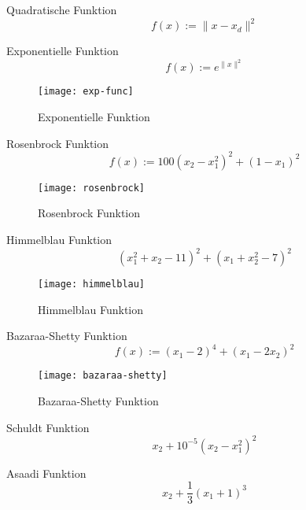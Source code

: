 
\begin{testfunction}
Quadratische Funktion
\[
  f(x) := \| x - x_d \|^2
\]
\end{testfunction}

\begin{testfunction}
Exponentielle Funktion
\[
  f(x) := e^{\|x\|^2}
\]
\end{testfunction}

\begin{figure}[h]
  \centering
  \texttt{[image: exp-func]}
  \caption{Exponentielle Funktion}
  \label{fig:exp_func}
\end{figure}

\begin{testfunction}
Rosenbrock Funktion
\[
  f(x) := 100(x_2-x_1^2)^2+(1-x_1)^2
\]
\end{testfunction}

\begin{figure}[h]
  \centering
  \texttt{[image: rosenbrock]}
  \caption{Rosenbrock Funktion}
  \label{fig:rosenbrock}
\end{figure}

\begin{testfunction}
Himmelblau Funktion
\[
(x_1^2+x_2-11)^2 + (x_1+x_2^2-7)^2
\]
\end{testfunction}

\begin{figure}[h]
  \centering
  \texttt{[image: himmelblau]}
  \caption{Himmelblau Funktion}
  \label{fig:himmelblau}
\end{figure}

\begin{testfunction}
Bazaraa-Shetty Funktion
\[
  f(x) := (x_1-2)^4+(x_1-2x_2)^2
\]
\end{testfunction}

\begin{figure}[h]
  \centering
  \texttt{[image: bazaraa-shetty]}
  \caption{Bazaraa-Shetty Funktion}
  \label{fig:bazaraa_shetty}
\end{figure}

\begin{testfunction}
Schuldt Funktion
\[
x_2+10^{-5}(x_2-x_1^2)^2
\]
\end{testfunction}

\begin{testfunction}
Asaadi Funktion
\[
x_2+\frac{1}{3}(x_1+1)^3
\]
\end{testfunction}

